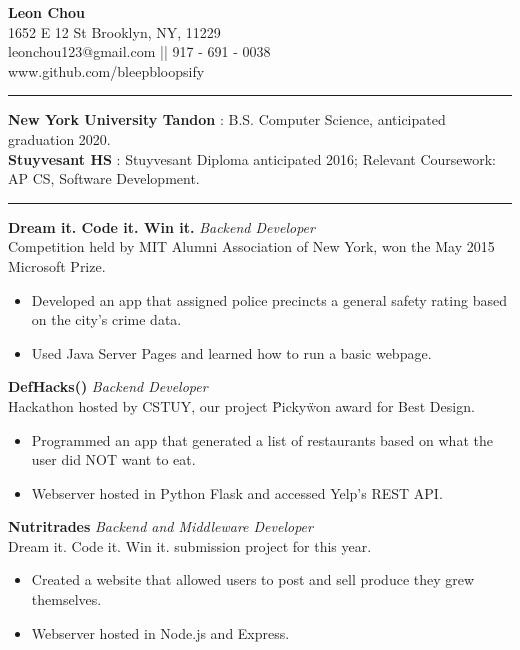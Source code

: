 \documentclass[14, .75in]{article}
\begin{document}
  \begin{center}
    \textbf{{\LARGE Leon Chou}}\\
    1652 E 12 St Brooklyn, NY, 11229 \\
    leonchou123@gmail.com || 917 - 691 - 0038\\ www.github.com/bleepbloopsify\\
  \end{center}
  \vspace{0.1cm} \hrule \vspace{0.3cm}
  \noindent\textbf{New York University Tandon} : B.S. Computer Science, anticipated graduation 2020.\\
  \textbf{Stuyvesant HS} : Stuyvesant Diploma anticipated 2016;
  Relevant Coursework: AP CS, Software Development.\\

  \vspace{0.1cm} \hrule \vspace{0.3cm}
  \noindent\textbf{Dream it. Code it. Win it.}\textit{ Backend Developer}\\
  Competition held by MIT Alumni Association of New York, won the May 2015 Microsoft Prize.
  \begin{itemize}[label={--},noitemsep, topsep=0pt]
    \item Developed an app that assigned police precincts a general safety rating based on the city's crime data.
    \item Used Java Server Pages and learned how to run a basic webpage.
  \end{itemize}
  \textbf{DefHacks()}\textit{ Backend Developer}\\ Hackathon hosted by CSTUY, our project \"Picky\" won award for Best Design.
  \begin{itemize}[label={--},noitemsep, topsep=0pt]
    \item Programmed an app that generated a list of restaurants based on what the user did NOT want to eat.
    \item Webserver hosted in Python Flask and accessed Yelp's REST API.
  \end{itemize}
  \textbf{Nutritrades}\textit{ Backend and Middleware Developer}\\
  Dream it. Code it. Win it. submission project for this year.
  \begin{itemize}[label={--},noitemsep, topsep=0pt]
    \item Created a website that allowed users to post and sell produce they grew themselves.
    \item Webserver hosted in Node.js and Express.\\
  \end{itemize}
\end{document}
